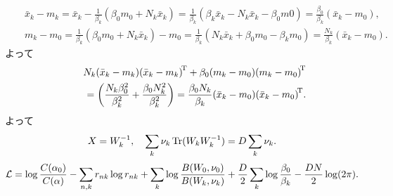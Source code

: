 \begin{eqnarray*}&&
\bar{x}_k-m_k=\bar{x}_k-\frac{1}{\beta_k}(\beta_0 m_0+N_k \bar{x}_k)=\frac{1}{\beta_k}(\beta_k \bar{x}_k-N_k \bar{x}_k - \beta_0 m0)=\frac{\beta_0}{\beta_k}(\bar{x}_k-m_0),
\\&&
m_k-m_0=\frac{1}{\beta_k}(\beta_0 m_0+N_k \bar{x}_k)-m_0=\frac{1}{\beta_k}(N_k \bar{x}_k+\beta_0 m_0-\beta_k m_0)=\frac{N_k}{\beta_k}(\bar{x}_k-m_0).
\end{eqnarray*}
よって
\begin{eqnarray*}&&
N_k (\bar{x}_k-m_k){(\bar{x}_k-m_k)}^{\!\mathrm{T}}+\beta_0(m_k-m_0){(m_k-m_0)}^{\!\mathrm{T}}
\\&&\qquad
= \left(\frac{N_k\beta_0^2}{\beta_k^2}+\frac{\beta_0 N_k^2}{\beta_k^2}\right)
= \frac{\beta_0 N_k}{\beta_k}(\bar{x}_k-m_0){(\bar{x}_k-m_0)}^{\!\mathrm{T}}.
\end{eqnarray*}
よって
$$
X=W_k^{-1}, \quad \sum_k \nu_k \mathop{\mathrm{Tr}}\nolimits(W_k W_k^{-1})=D\sum_k \nu_k.
$$
$$
{\cal L} = \log \frac{C(\alpha_0)}{C(\alpha)}-\sum_{n,k}r_{nk} \log r_{nk}+\sum_k \log \frac{B(W_0,\nu_0)}{B(W_k,\nu_k)}
 + \frac{D}{2}\sum_k \log \frac{\beta_0}{\beta_k}-\frac{DN}{2}\log (2\pi).
$$
\vspace{0pt}

